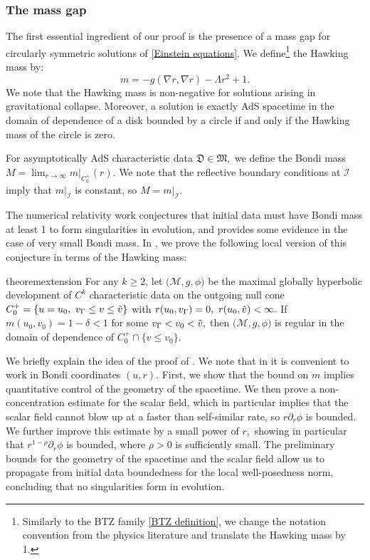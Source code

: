 \documentclass[11pt]{article}
\numberwithin{equation}{section}
\begin{document}
\subsubsection{The mass gap}\label{mass gap intro section}

The first essential ingredient of our proof is the presence of a mass gap for circularly symmetric solutions of \eqref{Einstein equations}. We define\footnote{Similarly to the BTZ family \eqref{BTZ definition}, we change the notation convention from the physics literature and translate the Hawking mass by 1.} the Hawking mass by:
\begin{equation}\label{Hawking mass}
    m=-g(\nabla r,\nabla r)-\Lambda r^2+1.
\end{equation}
We note that the Hawking mass is non-negative for solutions arising in gravitational collapse. Moreover, a solution is exactly AdS spacetime in the domain of dependence of a disk bounded by a circle if and only if the Hawking mass of the circle is zero.

For asymptotically AdS characteristic data $\mathfrak{D}\in\mathfrak{M},$ we define the Bondi mass $M=\lim_{r\rightarrow\infty}m|_{C_0^+}(r).$ We note that the reflective boundary conditions at $\mathcal{I}$ imply that $m|_{\mathcal{I}}$ is constant, so $M=m|_{\mathcal{I}}.$

The numerical relativity work \cite{ADS3} conjectures that initial data must have Bondi mass at least 1 to form singularities in evolution, and provides some evidence in the case of very small Bondi mass. In , we prove the following local version of this conjecture in terms of the Hawking mass: %
\begin{restatable}{theorem}{extension}\label{mass gap theorem}
    For any $k\geq 2$, let $\big(\mathcal{M},g,\phi\big)$ be the maximal globally hyperbolic development of $C^k$ characteristic data on the outgoing null cone $C_0^+=\{u=u_0,\ v_{\Gamma}\leq v\leq\Tilde{v}\}$ with $r(u_0,v_{\Gamma})=0,\ r(u_0,\Tilde{v})<\infty.$ If $m(u_0,v_0)=1-\delta<1$ for some $v_{\Gamma}< v_0<\Tilde{v},$ then $\big(\mathcal{M},g,\phi\big)$ is regular in the domain of dependence of $C_0^+\cap\{v\leq v_0\}.$
\end{restatable}

We briefly explain the idea of the proof of . We note that in  it is convenient to work in Bondi coordinates $(u,r).$ First, we show that the bound on $m$ implies quantitative control of the geometry of the spacetime. We then prove a non-concentration estimate for the scalar field, which in particular implies that the scalar field cannot blow up at a faster than self-similar rate, so $r\partial_r\phi$ is bounded. We further improve this estimate by a small power of $r,$ showing in particular that  $r^{1-\rho}\partial_r\phi$ is bounded, where $\rho>0$ is sufficiently small. The preliminary bounds for the geometry of the spacetime and the scalar field allow us to propagate from initial data boundedness for the local well-posedness norm, concluding that no singularities form in evolution.
\end{document}
